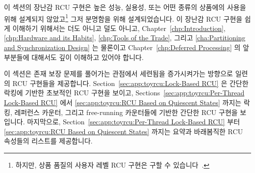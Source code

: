 

이 섹션의 장난감 RCU 구현은 높은 성능, 실용성, 또는 어떤 종류의 상품에의 사용을
위해 설계되지 않았고\footnote{
	하지만, 상품 품질의 사용자 레벨 RCU 구현은 구할 수
	있습니다~\cite{MathieuDesnoyers2009URCU}.}
그저 분명함을 위해 설계되었습니다.
이 장난감 RCU 구현을 쉽게 이해하기 위해서는 더도 아니고 덜도 아니고,
Chapter~\ref{chp:Introduction},
\ref{chp:Hardware and its Habits},
\ref{chp:Tools of the Trade}, 그리고
\ref{cha:Partitioning and Synchronization Design}
는 물론이고
Chapter~\ref{chp:Deferred Processing} 의 앞부분들에 대해서도 깊이 이해하고
있어야 합니다.
\iffalse

The toy RCU implementations in this section are designed not for
high performance, practicality, or any kind of production use,\footnote{
	However, production-quality user-level RCU implementations
	are available~\cite{MathieuDesnoyers2009URCU,MathieuDesnoyers2012URCU}.}
but rather for clarity.
Nevertheless, you will need a thorough understanding of
Chapters~\ref{chp:Introduction},
\ref{chp:Hardware and its Habits},
\ref{chp:Tools of the Trade},
\ref{cha:Partitioning and Synchronization Design},
and~\ref{chp:Deferred Processing}
for even these toy RCU implementations to be easily understandable.
\fi

이 섹션은 존재 보장 문제를 풀어가는 관점에서 세련됨을 증가시켜가는 방향으로
일련의 RCU 구현들을 제공합니다.
Section~\ref{sec:app:toyrcu:Lock-Based RCU} 은 간단한 락킹에 기반한 초보적인 RCU 구현을
보이고,
Sections~\ref{sec:app:toyrcu:Per-Thread Lock-Based RCU} 에서
\ref{sec:app:toyrcu:RCU Based on Quiescent States}
까지는 락킹, 레퍼런스 카운터, 그리고 free-running 카운터들에 기반한 간단한 RCU
구현을 보입니다.
마지막으로,
Section~\ref{sec:app:toyrcu:Per-Thread Lock-Based RCU} 부터
\ref{sec:app:toyrcu:RCU Based on Quiescent States} 까지는
요약과 바래봄직한 RCU 속성들의 리스트를 제공합니다.
\iffalse

This section provides a series of RCU implementations in order of
increasing sophistication, from the viewpoint of solving the
existence-guarantee problem.
Section~\ref{sec:app:toyrcu:Lock-Based RCU} presents a rudimentary
RCU implementation based on simple locking, while
Sections~\ref{sec:app:toyrcu:Per-Thread Lock-Based RCU} through
\ref{sec:app:toyrcu:RCU Based on Quiescent States}
present a series of
simple RCU implementations based on locking, reference counters,
and free-running counters.
Finally, Section~\ref{sec:app:toyrcu:Summary of Toy RCU Implementations}
provides a summary and a list of desirable RCU properties.
\fi

